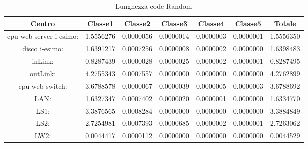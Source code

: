 \begin{table}[H]
\begin{center}\begin{scriptsize}
\begin{tabular}{||c|c|c|c|c|c|c||}
\hline
Centro &Classe1 &Classe2 &Classe3 &Classe4 &Classe5 &Totale\\
\hline
\hline
 cpu web server i-esimo: 	&1.5556276	&0.0000056	&0.0000014	&0.0000003	&0.0000001	&1.5556350\\
\hline
 disco i-esimo: 	&1.6391217	&0.0007256	&0.0000008	&0.0000002	&0.0000000	&1.6398483\\
\hline
 inLink: 	&0.8287439	&0.0000028	&0.0000025	&0.0000002	&0.0000001	&0.8287495\\
\hline
 outLink: 	&4.2755343	&0.0007557	&0.0000000	&0.0000000	&0.0000000	&4.2762899\\
\hline
 cpu web switch: 	&3.6788578	&0.0000067	&0.0000039	&0.0000005	&0.0000003	&3.6788692\\
\hline
 LAN: 	&1.6327347	&0.0007402	&0.0000020	&0.0000001	&0.0000000	&1.6334770\\
\hline
 LS1: 	&3.3876565	&0.0008284	&0.0000000	&0.0000000	&0.0000000	&3.3884849\\
\hline
 LS2: 	&2.7254981	&0.0007393	&0.0000685	&0.0000002	&0.0000001	&2.7263062\\
\hline
 LW2: 	&0.0044417	&0.0000112	&0.0000000	&0.0000000	&0.0000000	&0.0044529\\
\hline
\end{tabular}
\end{scriptsize}\end{center}
\caption{Lunghezza code Random}
\label{ris}
\end{table}

